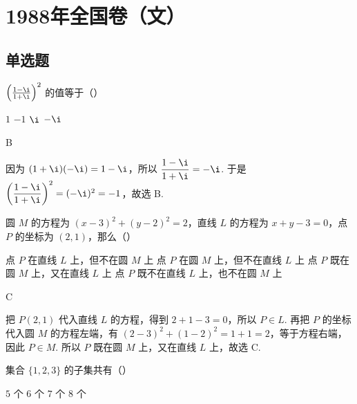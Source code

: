 \documentclass[UTF8,a4paper,oneside,11pt]{ctexbook}
\begin{document}
\mainmatter

\chapter{1988年全国卷（文）}

\section{单选题}

\begin{problem}
\(\left(\frac{1-\i}{1+\i}\right)^2\) 的值等于（\quad）

\choices
    {\(1\)}
    {\(-1\)}
    {\(\i\)}
    {\(-\i\)}
\end{problem}

\begin{answer}
B
\end{answer}

\begin{solution}
因为 \((1+\i)(-\i)=1-\i\)，所以
\(\dfrac{1-\i}{1+\i}=-\i\). 于是
\(\left(\dfrac{1-\i}{1+\i}\right)^2=(-\i)^2=-1\)，故选 B.
\end{solution}


\begin{problem}
圆 \(M\) 的方程为 \(\left(x-3\right)^2 + \left(y-2\right)^2 = 2\)，直线 \(L\) 的方程为 \(x+y-3 = 0\)，点 \(P\) 的坐标为 \((2,1)\)，那么（\quad）

\choices
    {点 \(P\) 在直线 \(L\) 上，但不在圆 \(M\) 上}
    {点 \(P\) 在圆 \(M\) 上，但不在直线 \(L\) 上}
    {点 \(P\) 既在圆 \(M\) 上，又在直线 \(L\) 上}
    {点 \(P\) 既不在直线 \(L\) 上，也不在圆 \(M\) 上}
\end{problem}

\begin{answer}
C
\end{answer}

\begin{solution}
把 \(P\left(2,1\right)\) 代入直线 \(L\) 的方程，得到
\(2+1-3=0\)，所以 \(P\in L\). 再把 \(P\) 的坐标代入圆 \(M\) 的方程左端，有
\(\left(2-3\right)^2+\left(1-2\right)^2=1+1=2\)，等于方程右端，因此 \(P\in M\). 所以 \(P\) 既在圆 \(M\) 上，又在直线 \(L\) 上，故选 C.
\end{solution}

\begin{problem}
集合 \(\{1,2,3\}\) 的子集共有（\quad）

\choices
    {\(5\) 个}
    {\(6\) 个}
    {\(7\) 个}
    {\(8\) 个}
\end{problem}
\end{document}
